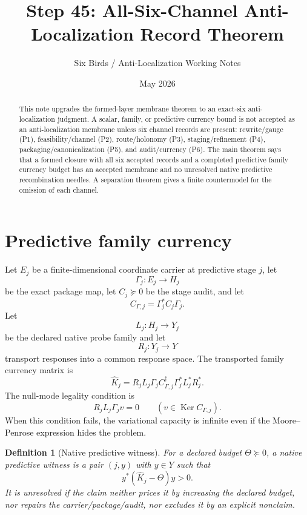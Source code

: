 \documentclass[11pt]{article}
\title{Step 45: All-Six-Channel Anti-Localization Record Theorem}
\author{Six Birds / Anti-Localization Working Notes}
\date{May 2026}
\newtheorem{definition}{Definition}
\newcommand{\ThetaB}{\Theta}
\newcommand{\Ker}{\operatorname{Ker}}
\begin{document}
\maketitle

\begin{abstract}
This note upgrades the formed-layer membrane theorem to an exact-six anti-localization judgment.  A scalar, family, or predictive currency bound is not accepted as an anti-localization membrane unless six channel records are present: rewrite/gauge (P1), feasibility/channel (P2), route/holonomy (P3), staging/refinement (P4), packaging/canonicalization (P5), and audit/currency (P6).  The main theorem says that a formed closure with all six accepted records and a completed predictive family currency budget has an accepted membrane and no unresolved native predictive recombination needles.  A separation theorem gives a finite countermodel for the omission of each channel.
\end{abstract}

\section{Predictive family currency}
Let $E_j$ be a finite-dimensional coordinate carrier at predictive stage $j$, let
\[
  \Gamma_j:E_j\to H_j
\]
be the exact package map, let $C_j\succeq0$ be the stage audit, and let
\[
  C_{\Gamma,j}=\Gamma_j^*C_j\Gamma_j.
\]
Let
\[
  L_j:H_j\to Y_j
\]
be the declared native probe family and let
\[
  R_j:Y_j\to Y
\]
transport responses into a common response space.  The transported family currency matrix is
\[
  \widehat K_j
  =R_jL_j\Gamma_j C_{\Gamma,j}^{\dagger}\Gamma_j^*L_j^*R_j^*.
\]
The null-mode legality condition is
\[
  R_jL_j\Gamma_j v=0\qquad(v\in \Ker C_{\Gamma,j}).
\]
When this condition fails, the variational capacity is infinite even if the Moore--Penrose expression hides the problem.

\begin{definition}[Native predictive witness]
For a declared budget $\ThetaB\succeq0$, a native predictive witness is a pair $(j,y)$ with $y\in Y$ such that
\[
  y^*(\widehat K_j-\ThetaB)y>0.
\]
It is unresolved if the claim neither prices it by increasing the declared budget, nor repairs the carrier/package/audit, nor excludes it by an explicit nonclaim.
\end{definition}
\end{document}
